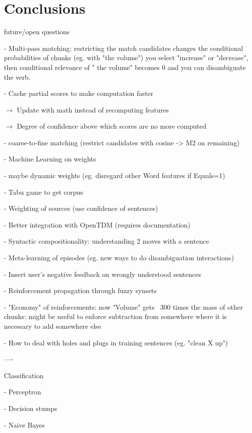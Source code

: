
\chapter{Conclusions} %

\label{ch:conclusions} %



future/open questions

- Multi-pass matching: restricting the match candidates changes the
   conditional probabilities of chunks (eg. with "the volume") you select
   "increase" or "decrease", then conditional relevance of " the volume" becomes
   0 and you can disambiguate the verb.
   
- Cache partial scores to make computation faster
 
   $\rightarrow$ Update with math instead of recomputing features
   
   $\rightarrow$ Degree of confidence above which scores are no more computed
   
- coarse-to-fine matching (restrict candidates with cosine -> M2 on remaining)
 
- Machine Learning on weights
 
- maybe dynamic weights (eg. disregard other Word features if Equals=1)
 
- Tabu game to get corpus
 
- Weighting of sources (use confidence of sentences)
 
- Better integration with OpenTDM (requires documentation)
 
- Syntactic compositionality: understanding 2 moves with a sentence
 
- Meta-learning of episodes (eg. new ways to do disambiguation interactions)
 
- Insert user's negative feedback on wrongly understood sentences
 
- Reinforcement propagation through fuzzy synsets
 
- "Economy" of reinforcements: now "Volume" gets ~300 times the mass of other
   chunks: might be useful to enforce subtraction from somewhere where it is
   necessary to add somewhere else 
   
- How to deal with holes and plugs in training sentences (eg. "clean X up")
 


----

Classification

- Perceptron
 
- Decision stumps
 
- Naive Bayes
